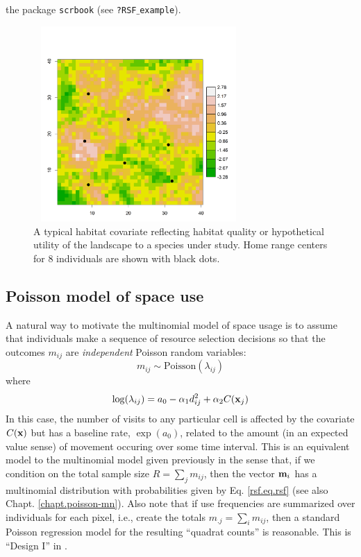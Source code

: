 the package \mbox{\tt scrbook} (see \mbox{\tt ?RSF$\_$example}).
\begin{figure}[ht]
\centering
\includegraphics[width=3.15in,height=2.93in]{Ch13-RSF/figs/habitat.png}
\caption{A typical habitat covariate reflecting habitat quality or
  hypothetical utility of the landscape to a species under study. Home
  range centers for 8 individuals are shown with black dots.}
\label{rsf.fig.habitat}
\end{figure}

\subsection{Poisson model of space use}

A natural way to motivate the multinomial model of space usage is to
assume that individuals make a sequence of resource selection
decisions so that the outcomes $m_{ij}$ are {\it
  independent} Poisson random variables:
\[
 m_{ij} \sim \mbox{Poisson}( \lambda_{ij})
\]
where
\[
 \log(\lambda_{ij}) = a_{0} -\alpha_{1} d_{ij}^{2} +  \alpha_{2} C({\bf x}_{j})
\]
In this case, the number of visits to any particular cell is affected
by the covariate $C({\bf x})$ but has a baseline rate, $\exp(a_{0})$,
related to the amount (in an expected value sense) of movement occuring over some time interval.
This is an equivalent model to the multinomial model given previously
in the sense that, if we condition on the total sample size $R = 
\sum_{j} m_{ij}$, then the vector ${\bf m}_{i}$ has a multinomial
distribution with probabilities given by Eq. \ref{rsf.eq.rsf} (see
also Chapt. \ref{chapt.poisson-mn}).  Also note that if use
frequencies are summarized over individuals for each pixel, i.e.,
create the totals $m_{.j} = \sum_i m_{ij}$, then a standard Poisson
regression model for the resulting ``quadrat counts'' is
reasonable. This is ``Design I'' in \citet{manly_etal:2002}.

